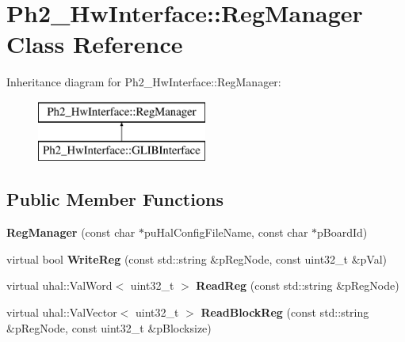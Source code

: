 \hypertarget{class_ph2___hw_interface_1_1_reg_manager}{\section{Ph2\-\_\-\-Hw\-Interface\-:\-:Reg\-Manager Class Reference}
\label{class_ph2___hw_interface_1_1_reg_manager}
}
Inheritance diagram for Ph2\-\_\-\-Hw\-Interface\-:\-:Reg\-Manager\-:\begin{figure}[H]
\begin{center}
\leavevmode
\includegraphics[height=2.000000cm]{class_ph2___hw_interface_1_1_reg_manager}
\end{center}
\end{figure}
\subsection*{Public Member Functions}
\begin{DoxyCompactItemize}
\item 
\hypertarget{class_ph2___hw_interface_1_1_reg_manager_a2af587b23e2ab0e8be35feac45a61d34}{{\bfseries Reg\-Manager} (const char $\ast$pu\-Hal\-Config\-File\-Name, const char $\ast$p\-Board\-Id)}\label{class_ph2___hw_interface_1_1_reg_manager_a2af587b23e2ab0e8be35feac45a61d34}

\item 
\hypertarget{class_ph2___hw_interface_1_1_reg_manager_a31174516fef6706c88c3f59dd93e4fdf}{virtual bool {\bfseries Write\-Reg} (const std\-::string \&p\-Reg\-Node, const uint32\-\_\-t \&p\-Val)}\label{class_ph2___hw_interface_1_1_reg_manager_a31174516fef6706c88c3f59dd93e4fdf}

\item 
\hypertarget{class_ph2___hw_interface_1_1_reg_manager_a077e0a18592206365150680213345112}{virtual uhal\-::\-Val\-Word$<$ uint32\-\_\-t $>$ {\bfseries Read\-Reg} (const std\-::string \&p\-Reg\-Node)}\label{class_ph2___hw_interface_1_1_reg_manager_a077e0a18592206365150680213345112}

\item 
\hypertarget{class_ph2___hw_interface_1_1_reg_manager_a6481c211d27badc409ff0e7af20575e4}{virtual uhal\-::\-Val\-Vector$<$ uint32\-\_\-t $>$ {\bfseries Read\-Block\-Reg} (const std\-::string \&p\-Reg\-Node, const uint32\-\_\-t \&p\-Blocksize)}\label{class_ph2___hw_interface_1_1_reg_manager_a6481c211d27badc409ff0e7af20575e4}

\end{DoxyCompactItemize}
